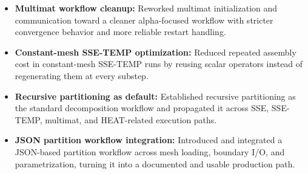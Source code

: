 \documentclass[11pt,a4paper]{article}
\begin{document}
\begin{itemize}[leftmargin=*,itemsep=0.8em]
  \item \textbf{Multimat workflow cleanup:} Reworked multimat initialization and communication toward a cleaner alpha-focused workflow with stricter convergence behavior and more reliable restart handling.

  \item \textbf{Constant-mesh SSE-TEMP optimization:} Reduced repeated assembly cost in constant-mesh SSE-TEMP runs by reusing scalar operators instead of regenerating them at every substep.

  \item \textbf{Recursive partitioning as default:} Established recursive partitioning as the standard decomposition workflow and propagated it across SSE, SSE-TEMP, multimat, and HEAT-related execution paths.

  \item \textbf{JSON partition workflow integration:} Introduced and integrated a JSON-based partition workflow across mesh loading, boundary I/O, and parametrization, turning it into a documented and usable production path.
\end{itemize}
\end{document}
